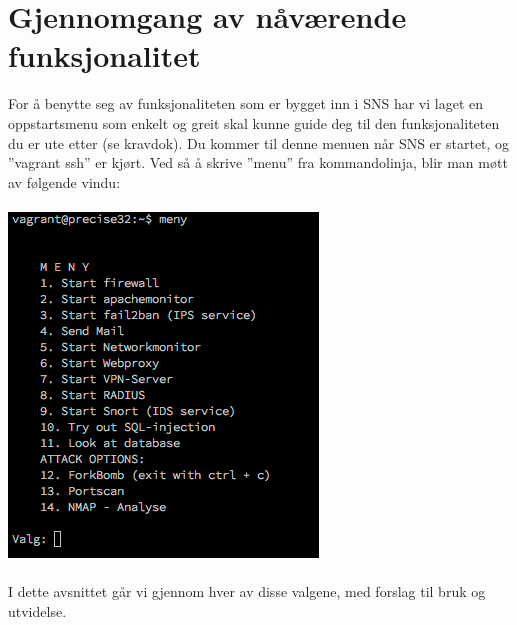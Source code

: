 \documentclass{article}
\begin{document}
\section{Gjennomgang av nåværende funksjonalitet}
For å benytte seg av funksjonaliteten som er bygget inn i SNS har vi laget en oppstartsmenu som enkelt og greit skal kunne guide deg til den funksjonaliteten du er ute etter (se kravdok). Du kommer til denne menuen når SNS er startet, og ''vagrant ssh'' er kjørt. Ved så å skrive ''menu'' fra kommandolinja, blir man møtt av følgende vindu: 
\\ \\
\includegraphics[scale=0.8]{pictures/meny.png} 
\\ \\
I dette avsnittet går vi gjennom hver av disse valgene, med forslag til bruk og utvidelse. 
\end{document}

